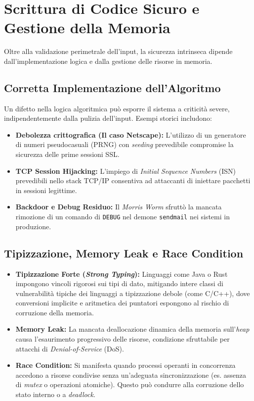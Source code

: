 \section{Scrittura di Codice Sicuro e Gestione della Memoria}
Oltre alla validazione perimetrale dell'input, la sicurezza intrinseca dipende dall'implementazione logica e dalla gestione delle risorse in memoria.

\subsection{Corretta Implementazione dell'Algoritmo}
Un difetto nella logica algoritmica può esporre il sistema a criticità severe, indipendentemente dalla pulizia dell'input. Esempi storici includono:
\begin{itemize}
    \item \textbf{Debolezza crittografica (Il caso Netscape):} L'utilizzo di un generatore di numeri pseudocasuali (PRNG) con \textit{seeding} prevedibile compromise la sicurezza delle prime sessioni SSL.
    \item \textbf{TCP Session Hijacking:} L'impiego di \textit{Initial Sequence Numbers} (ISN) prevedibili nello stack TCP/IP consentiva ad attaccanti di iniettare pacchetti in sessioni legittime.
    \item \textbf{Backdoor e Debug Residuo:} Il \textit{Morris Worm} sfruttò la mancata rimozione di un comando di \texttt{DEBUG} nel demone \texttt{sendmail} nei sistemi in produzione.
\end{itemize}

\subsection{Tipizzazione, Memory Leak e Race Condition}
\begin{itemize}
    \item \textbf{Tipizzazione Forte (\textit{Strong Typing}):} Linguaggi come Java o Rust impongono vincoli rigorosi sui tipi di dato, mitigando intere classi di vulnerabilità tipiche dei linguaggi a tipizzazione debole (come C/C++), dove conversioni implicite e aritmetica dei puntatori espongono al rischio di corruzione della memoria.
    \item \textbf{Memory Leak:} La mancata deallocazione dinamica della memoria sull'\textit{heap} causa l'esaurimento progressivo delle risorse, condizione sfruttabile per attacchi di \textit{Denial-of-Service} (DoS).
    \item \textbf{Race Condition:} Si manifesta quando processi operanti in concorrenza accedono a risorse condivise senza un'adeguata sincronizzazione (es. assenza di \textit{mutex} o operazioni atomiche). Questo può condurre alla corruzione dello stato interno o a \textit{deadlock}.
\end{itemize}

